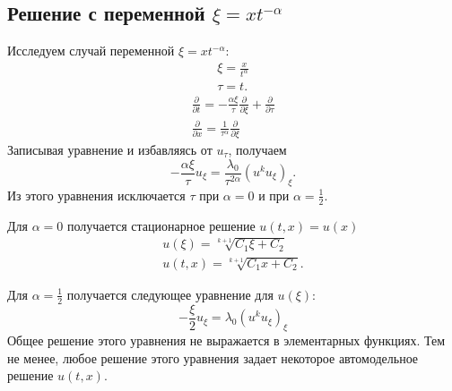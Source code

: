 \documentclass[12pt]{article}
\newcommand{\pd}[2]{\frac{\partial #1}{\partial #2}}
\begin{document}
\subsection{Решение с переменной $\xi = xt^{-\alpha}$}
Исследуем случай переменной $\xi = xt^{-\alpha}$:
\begin{gather*}
\xi = \frac{x}{t^\alpha}\\
\tau = t.
\end{gather*}
\begin{gather*}
\pd{}{t} = -\frac{\alpha \xi}{\tau} \pd{}{\xi} + \pd{}{\tau}
\\
\pd{}{x} = \frac{1}{\tau^\alpha} \pd{}{\xi}
\end{gather*}
Записывая уравнение и избавляясь от $u_\tau$, получаем
\[
-\frac{\alpha \xi}{\tau} u_\xi = \frac{\lambda_0}{\tau^{2\alpha}}(u^k u_\xi)_\xi.
\]
Из этого уравнения исключается $\tau$ при $\alpha = 0$ и при $\alpha = \frac{1}{2}$.

Для $\alpha = 0$ получается стационарное решение $u(t, x) = u(x)$
\begin{gather*}
u(\xi) = \sqrt[k+1]{C_1 \xi + C_2}\\
u(t, x) = \sqrt[k+1]{C_1 x + C_2}.
\end{gather*}

Для $\alpha = \frac{1}{2}$ получается следующее уравнение для $u(\xi)$:
\[
-\frac{\xi}{2}u_\xi = \lambda_0 (u^k u_\xi)_\xi
\]
Общее решение этого уравнения не выражается в элементарных функциях. Тем не менее, любое решение этого уравнения задает некоторое автомодельное решение $u(t, x)$.
\end{document}

